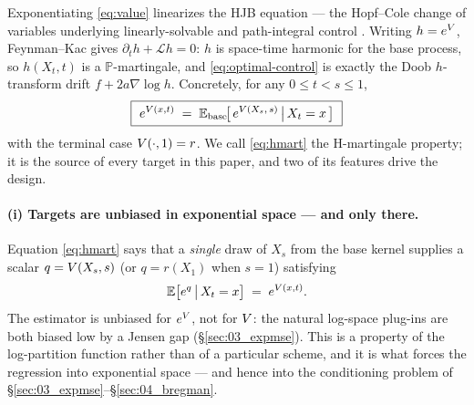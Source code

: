 Exponentiating \eqref{eq:value} linearizes the HJB equation --- the Hopf--Cole
change of variables underlying linearly-solvable and path-integral control
\citep{kappen2005path,todorov2009efficient}. Writing
$h = e^{V}$, Feynman--Kac gives $\partial_t h + \mathcal{L}h = 0$: $h$ is
space-time harmonic for the base process, so $h(X_t,t)$ is a $\mathbb{P}$-martingale,
and \eqref{eq:optimal-control} is exactly the Doob $h$-transform drift
$f + 2a\nabla\log h$. Concretely, for any $0\le t<s\le 1$,
\begin{equation}
  \boxed{\ e^{V(x,t)} \;=\; \mathbb{E}_{\mathrm{base}}\!\big[\,e^{V(X_s,\,s)}\,\big|\,X_t=x\,\big]\ }
  \label{eq:hmart}
\end{equation}
with the terminal case $V(\cdot,1)=r$. We call \eqref{eq:hmart} the
H-martingale property; it is the source of every target in this paper, and two
of its features drive the design.

\paragraph{(i) Targets are unbiased in exponential space --- and only there.}
Equation \eqref{eq:hmart} says that a \emph{single} draw of $X_s$ from the base
kernel supplies a scalar $q = V(X_s,s)$ (or $q=r(X_1)$ when $s=1$) satisfying
\begin{equation}
  \mathbb{E}\big[e^{q}\,\big|\,X_t=x\big] \;=\; e^{V(x,t)}.
  \label{eq:unbiased-target}
\end{equation}
The estimator is unbiased for $e^{V}$, not for $V$: the natural log-space
plug-ins are both biased low by a Jensen gap (\S\ref{sec:03_expmse}). This is a
property of the log-partition function rather than of a particular scheme, and
it is what forces the regression into exponential space --- and hence into the
conditioning problem of \S\ref{sec:03_expmse}--\S\ref{sec:04_bregman}.

